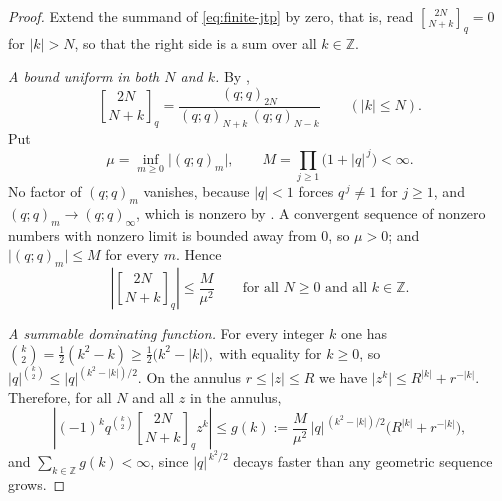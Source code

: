 \documentclass[11pt,oneside,openany]{book}
\theoremstyle{definition}
\theoremstyle{remark}
\newcommand{\qbinom}[2]{\genfrac{[}{]}{0pt}{}{#1}{#2}_{q}}
\newcommand{\Z}{\mathbb Z}
\newcommand{\abs}[1]{\lvert #1\rvert}
\newcommand{\defeq}{\mathrel{:=}}
\begin{document}
\begin{proof}
Extend the summand of \eqref{eq:finite-jtp} by zero, that is, read $\qbinom{2N}{N+k}=0$ for $\abs k>N$, so that the right side is a sum over all $k\in\Z$.

\emph{A bound uniform in both $N$ and $k$.}  By ,
\[
 \qbinom{2N}{N+k}
 =\frac{(q;q)_{2N}}{(q;q)_{N+k}\,(q;q)_{N-k}}
 \qquad(\abs k\le N).
\]
Put
\[
 \mu=\inf_{m\ge0}\abs{(q;q)_m},
 \qquad
 M=\prod_{j\ge1}\bigl(1+\abs q^{\,j}\bigr)<\infty .
\]
No factor of $(q;q)_m$ vanishes, because $\abs q<1$ forces $q^{\,j}\ne1$ for $j\ge1$, and $(q;q)_m\to(q;q)_\infty$, which is nonzero by .  A convergent sequence of nonzero numbers with nonzero limit is bounded away from $0$, so $\mu>0$; and $\abs{(q;q)_m}\le M$ for every $m$.  Hence
\begin{equation}
 \left|\qbinom{2N}{N+k}\right|\le\frac{M}{\mu^{2}}
 \qquad\text{for all }N\ge0\text{ and all }k\in\Z .
 \label{eq:central-qbinom-uniform-bound}
\end{equation}

\emph{A summable dominating function.}  For every integer $k$ one has
\(
 \binom k2=\tfrac12(k^2-k)\ge\tfrac12\bigl(k^2-\abs k\bigr),
\)
with equality for $k\ge0$, so $\abs q^{\binom k2}\le\abs q^{(k^2-\abs k)/2}$.  On the annulus $r\le\abs z\le R$ we have $\abs{z^{k}}\le R^{\abs k}+r^{-\abs k}$.  Therefore, for all $N$ and all $z$ in the annulus,
\[
 \left|(-1)^kq^{\binom k2}\qbinom{2N}{N+k}z^{k}\right|
 \le g(k)\defeq
 \frac{M}{\mu^{2}}\,\abs q^{\,(k^2-\abs k)/2}
 \bigl(R^{\abs k}+r^{-\abs k}\bigr),
\]
and $\sum_{k\in\Z}g(k)<\infty$, since $\abs q^{\,k^2/2}$ decays faster than any geometric sequence grows.


\end{proof}
\end{document}
